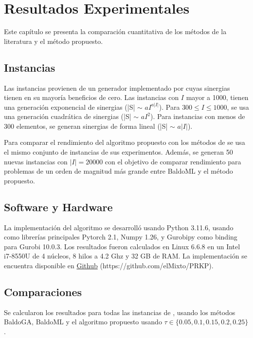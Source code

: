\documentclass[spanish, a4paper, 12pt, openany,final]{book}
\begin{document}
 
\clearpage
\chapter{Resultados Experimentales}
Este capítulo se presenta la comparación cuantitativa de los métodos de la literatura y el método propuesto.

\section{Instancias}

Las instancias provienen de un generador implementado por \cite{baldo_polynomial_2023} cuyas sinergias tienen en su mayoría beneficios de cero. Las instancias con $I$ mayor a 1000, tienen una generación exponencial de sinergias (|S| $\sim$ $aI^{a|I|}$). Para $300 \le I \le 1000$, se usa una generación cuadrática de sinergias (|S| $\sim$ $aI^{2}$). Para instancias con menos de 300 elementos, se generan sinergias de forma lineal (|S| $\sim$ $a|I|$).

Para comparar el rendimiento del algoritmo propuesto con los métodos de \cite{baldo_polynomial_2023} se usa el mismo conjunto de instancias de sus experimentos. Además, se generan 50 nuevas instancias con $|I| = 20000$ con el objetivo de comparar rendimiento para problemas de un orden de magnitud más grande entre BaldoML y el método propuesto.

\section{Software y Hardware}

La implementación del algoritmo se desarrolló usando Python 3.11.6, usando como librerías principales Pytorch 2.1, Numpy 1.26, y Gurobipy como binding para Gurobi 10.0.3. Los resultados fueron calculados en Linux 6.6.8 en un Intel i7-8550U de 4 núcleos, 8 hilos a 4.2 Ghz y 32 GB de RAM. La implementación se encuentra disponible en \href{https://github.com/elMixto/PRKP.git}{Github} (https://github.com/elMixto/PRKP).

\section{Comparaciones}


Se calcularon los resultados para todas las instancias de \cite{baldo_polynomial_2023}, usando los métodos BaldoGA, BaldoML y el algoritmo propuesto usando $\tau \in \{0.05,0.1,0.15,0.2,0.25 \}$.
\end{document}
